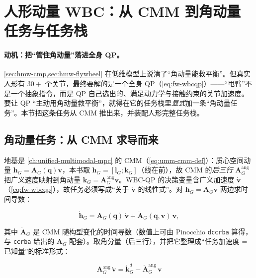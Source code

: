 \section{人形动量 WBC：从 CMM 到角动量任务与任务栈}
\label{sec:hmw-momentum-wbc}

\paragraph{动机：把“管住角动量”落进全身 QP。}
\cref{sec:hmw-cmp,sec:hmw-flywheel} 在低维模型上说清了“角动量能救平衡”。但真实人形有 $30+$ 个关节，最终要解的是一个全身 QP（\cref{eq:fw-wbcqp}）——“甩臂”不是一个抽象指令，而是 QP 自己选出的、满足动力学与接触约束的关节加速度。要让 QP “主动用角动量救平衡”，就得在它的任务栈里\emph{显式}加一条“角动量任务”。本节把这条任务从 CMM 推出来，并装配人形完整任务栈。

\subsection{角动量任务：从 CMM 求导而来}
\label{subsec:hmw-momentum-task}

地基是 \cref{ch:unified-multimodal-mpc} 的 CMM（\cref{eq:umm-cmm-def}）：质心空间动量 $\mathbf h_G=\mathbf A_G(\mathbf q)\mathbf v$，本书取 $\mathbf h_G=[\mathbf l_G;\mathbf k_G]$（线在前），故 CMM 的\emph{后三行} $\mathbf A_G^{\mathrm{ang}}$ 把广义速度映射到角动量 $\mathbf k_G=\mathbf A_G^{\mathrm{ang}}\mathbf v$。WBC-QP 的决策变量含广义加速度 $\dot{\mathbf v}$（\cref{eq:fw-wbcqp}），故任务必须写成“关于 $\dot{\mathbf v}$ 的线性式”。对 $\mathbf h_G=\mathbf A_G\mathbf v$ 两边求时间导数：

\begin{equation}
  \dot{\mathbf h}_G=\mathbf A_G(\mathbf q)\,\dot{\mathbf v}+\dot{\mathbf A}_G(\mathbf q,\mathbf v)\,\mathbf v,
  \label{eq:hmw-hGdot}
\end{equation}

其中 $\dot{\mathbf A}_G$ 是 CMM 随构型变化的时间导数（数值上可由 Pinocchio \texttt{dccrba} 算得，与 \texttt{ccrba} 给出的 $\mathbf A_G$ 配套）。取角分量（后三行），并把它整理成“任务加速度 = 已知量”的标准形式：

\begin{equation}
  \boxed{\;\mathbf A_G^{\mathrm{ang}}\,\dot{\mathbf v}=\dot{\mathbf k}_G^{d}-\dot{\mathbf A}_G^{\mathrm{ang}}\,\mathbf v\;}
  \label{eq:hmw-angular-task}
\end{equation}

